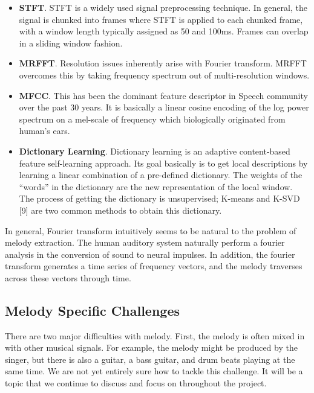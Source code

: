 \documentclass{article} %
\begin{document}
\begin{itemize}
\item \textbf{STFT}. STFT is a widely used signal preprocessing technique. In general, the signal is chunked into frames where STFT is applied to each chunked frame, with a window length typically assigned as 50 and 100ms. Frames can overlap in a sliding window fashion.

\item \textbf{MRFFT}. Resolution issues inherently arise with Fourier transform. MRFFT overcomes this by taking frequency spectrum out of multi-resolution windows.

\item \textbf{MFCC}. This has been the dominant feature descriptor in Speech community over the past 30 years. It is basically a linear cosine encoding of the log power spectrum on a mel-scale of frequency which biologically originated from human's ears. 

\item \textbf{Dictionary Learning}. Dictionary learning is an adaptive content-based feature self-learning approach. Its goal basically is to get local descriptions by learning a linear combination of a pre-defined dictionary. 
The weights of the “words” in the dictionary are the new representation of the local window. The process of getting the dictionary is unsupervised; K-means and K-SVD [9] are two common methods to obtain this dictionary.
\end{itemize}

In general, Fourier transform intuitively seems to be natural to the problem of melody extraction.  The human auditory system naturally perform a fourier analysis in the conversion of sound to neural impulses.  In addition, the fourier transform generates a time series of frequency vectors, and the melody traverses across these vectors through time.

\subsection{Melody Specific Challenges}

There are two major difficulties with melody.  First, the melody is often mixed in with other musical signals.  For example, the melody might be produced by the singer, but there is also a guitar, a bass guitar, and drum beats playing at the same time.  We are not yet entirely sure how to tackle this challenge.  It will be a topic that we continue to discuss and focus on throughout the project.
\end{document}
